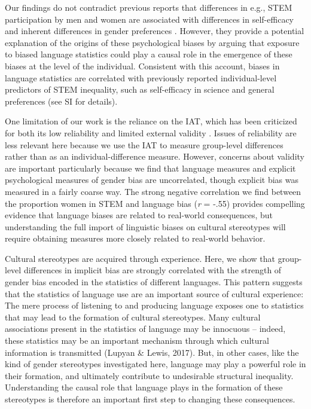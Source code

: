 \documentclass[9pt,twocolumn,twoside]{pnas-new}
\begin{document}
Our findings do not contradict previous reports that differences in e.g., STEM participation by men and women are associated with differences in self-efficacy \cite{stoet2018gender} and inherent differences in gender preferences \cite{falk2018relationship}. However, they provide a potential explanation of the origins of these psychological biases by arguing that exposure to biased language statistics could play a causal role in the emergence of these biases at the level of the individual. Consistent with this account, biases in language statistics are correlated with previously reported individual-level predictors of STEM inequality, such as self-efficacy in science and general preferences (see SI for details).

One limitation of our work is the reliance on the IAT, which has been criticized for both its low reliability \cite{lane2007understanding} and limited external validity \cite{fazio2003implicit}. Issues of reliability are less relevant here because we use the IAT to measure group-level differences rather than as an individual-difference measure. However, concerns about validity are important particularly because we find that language measures and explicit psychological measures of gender bias are uncorrelated, though explicit bias was measured in a fairly coarse way. The strong negative correlation we find between the proportion women in STEM and language bias (\emph{r} = -.55) provides compelling evidence that language biases are related to real-world consequences, but understanding the full import of linguistic biases on cultural stereotypes will require obtaining measures more closely related to real-world behavior. 

Cultural stereotypes are acquired through experience. Here, we show that
group-level differences in implicit bias are strongly correlated with
the strength of gender bias encoded in the statistics of different
languages. This pattern suggests that the statistics of language use are
an important source of cultural experience: The mere process of
listening to and producing language exposes one to statistics that may
lead to the formation of cultural stereotypes. Many cultural
associations present in the statistics of language may be innocuous --
indeed, these statistics may be an important mechanism through which
cultural information is transmitted (Lupyan \& Lewis, 2017). But, in
other cases, like the kind of gender stereotypes investigated here,
language may play a powerful role in their formation, and ultimately
contribute to undesirable structural inequality. Understanding the causal role that language plays in the
formation of these stereotypes is therefore an important first step to
changing these consequences.
\end{document}
